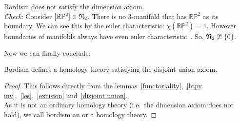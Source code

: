 \documentclass[a4paper,11pt]{article}
\begin{document}
\begin{observation}\label{dimension axiom}
    Bordism does not satisfy the dimension axiom.\\
    \textit{Check}: 
    Consider \([\mathbb{R}\mathbb{P}^2]\in \mathfrak{N}_2\). 
    There is no \(3\)-manifold that has \(\mathbb{RP}^2\) as its boundary. 
    We can see this by the euler characteristic: \(\chi(\mathbb{RP}^2)=1\). 
    However boundaries of manifolds always have even euler characteristic\ \cite[Proposition 18.6.2]{dieck}. 
    So, \(\mathfrak{N}_2\not\cong \{0\}\). 
\end{observation}


Now we can finally conclude:

\begin{theorem}
    Bordism defines a homology theory satisfying the disjoint union axiom.
\end{theorem}

\begin{proof}
    This follows directly from the lemmas\ \ref{functoriality},\ \ref{htpy inv},\ \ref{les},\ \ref{excision} and\ \ref{disjoint union}.\\
    As it is not an ordinary homology theory (i.e.\ the dimension axiom does not hold), we call bordism an  or a  homology theory.
\end{proof}


\end{document}
